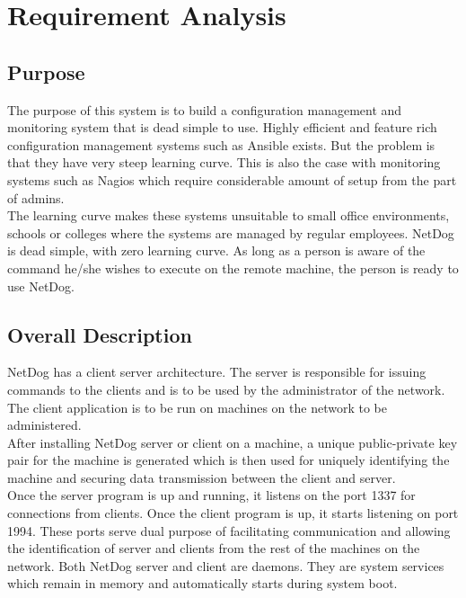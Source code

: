 \chapter{Requirement Analysis}

\section{Purpose}
\par
The purpose of this system is to build a configuration management and monitoring
system that is dead simple to use. Highly efficient and feature rich
configuration management systems such as Ansible exists. But the problem is that
they have very steep learning curve. This is also the case with monitoring
systems such as Nagios which require considerable amount of setup from the part
of admins.\\

The learning curve makes these systems unsuitable to small office environments,
schools or colleges where the systems are managed by regular employees. NetDog
is dead simple, with zero learning curve. As long as a person is aware of the
command he/she wishes to execute on the remote machine, the person is ready to
use NetDog.\\

\section{Overall Description}
\par
NetDog has a client server architecture. The server is responsible for issuing
commands to the clients and is to be used by the administrator of the network.
The client application is to be run on machines on the network to be
administered.\\

After installing NetDog server or client on a machine, a unique public-private
key pair for the machine is generated which is then used for uniquely
identifying the machine and securing data transmission between the client and
server.\\

Once the server program is up and running, it listens on the port 1337 for
connections from clients. Once the client program is up, it starts listening on
port 1994. These ports serve dual purpose of facilitating communication and
allowing the identification of server and clients from the rest of the machines
on the network. Both NetDog server and client are daemons. They are system 
services which remain in memory and automatically starts during system boot.\\

